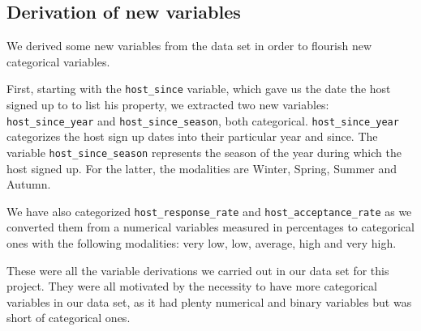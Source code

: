 \begin{comment} %

\subsubsection{Instance selection}

\subsubsection{Data transformation}

\end{comment}

\subsection{Derivation of new variables}

We derived some new variables from the data set in order to flourish new
categorical variables.

First, starting with the \texttt{host\_since} variable, which gave us the date
the host signed up to \airbnb to list his property, we extracted two new
variables: \texttt{host\_since\_year} and \texttt{host\_since\_season}, both
categorical. \texttt{host\_since\_year} categorizes the host sign up dates into
their particular year and since. The variable \texttt{host\_since\_season}
represents the season of the year during which the host signed up. For the
latter, the modalities are Winter, Spring, Summer and Autumn.

We have also categorized \texttt{host\_response\_rate} and
\texttt{host\_acceptance\_rate} as we converted them from a numerical variables
measured in percentages to categorical ones with the following modalities: very
low, low, average, high and very high.

These were all the variable derivations we carried out in our data set for this
project. They were all motivated by the necessity to have more categorical
variables in our data set, as it had plenty numerical and binary variables but
was short of categorical ones.



